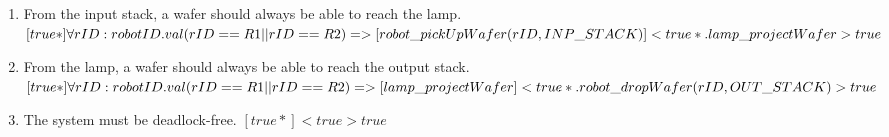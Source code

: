 \begin{enumerate}
    \item From the input stack, a wafer should always be able to reach the lamp.
        \newline
	        $[true*] \forall{rID}: robotID . val(rID == R1 || rID == R2) => \newline
        	[robot\_pickUpWafer(rID, INP\_STACK)]<true* . lamp\_projectWafer> true$
    \item From the lamp, a wafer should always be able to reach the output stack.
    \newline
        	$[true*] \forall{rID}: robotID . val(rID == R1 || rID == R2) => \newline
	        [lamp\_projectWafer]<true* . robot\_dropWafer(rID, OUT\_STACK)> true$
    \item The system must be deadlock-free.
	        \newline $[true*]<true>true$
\end{enumerate}